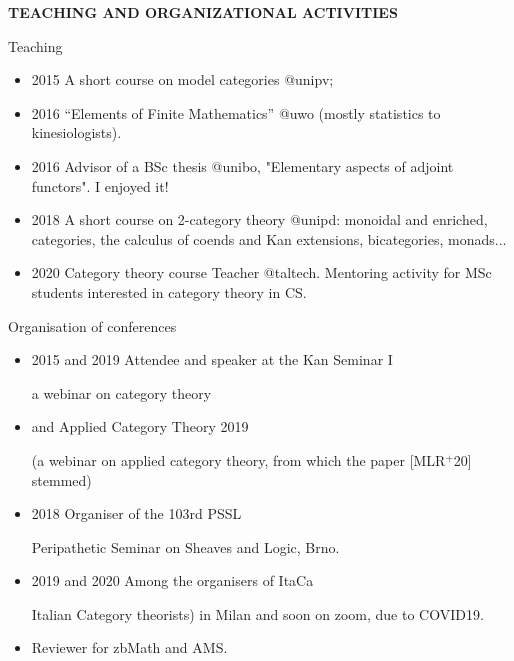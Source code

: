 \documentclass{beamer}
\def\lnk#1{\href{#1}{\faFilePdfO}}
\begin{document}
%
%
%
%
%
\begin{frame}
  \Huge\centering \bfseries TEACHING AND ORGANIZATIONAL ACTIVITIES
\end{frame}
%
\begin{frame}{Teaching}\small
  \begin{itemize}
    \item<+-> 2015 A short course on \alert{model categories} {\color{magenta} @unipv};
    \item<+-> 2016 ``\alert{Elements of Finite Mathematics}'' {\color{magenta} @uwo} (mostly statistics to kinesiologists).
    \item<+-> 2016 \alert{Advisor} of a BSc thesis {\color{magenta} @unibo}, "Elementary aspects of adjoint functors". I enjoyed it!
    \item<+-> 2018 A short course on \alert{2-category theory} {\color{magenta} @unipd}: monoidal and enriched, categories, the calculus of coends and Kan extensions, bicategories, monads...
    \item<+-> 2020 \alert{Category theory} course Teacher {\color{magenta} @taltech}. Mentoring activity for MSc students interested in category theory in CS.
\end{itemize}
\end{frame}
\begin{frame}{Organisation of conferences}\small
  \begin{itemize}
    \item<+-> 2015 and 2019 Attendee and speaker at the \alert{Kan Seminar I} 
    
    {\footnotesize\color{gray!40} a webinar on category theory}
    \item<+-> and \alert{Applied Category Theory} 2019 
    
    {\footnotesize\color{gray!40} (a webinar on applied category theory, from which the paper [\alert{MLR$^{+}$20}\lnk{https://arxiv.org/abs/2001.07488}] stemmed)}
    \item<+-> 2018 \alert{Organiser} of the 103rd \alert{PSSL}
    
    {\footnotesize\color{gray!40} Peripathetic Seminar on Sheaves and Logic, Brno.}
    \item<+-> 2019 and 2020 Among the \alert{organisers} of ItaCa 
    
    {\footnotesize\color{gray!40}  \alert{Ita}lian \alert{Ca}tegory theorists) in Milan and soon on zoom, due to COVID19.}
    \item<+-> Reviewer for zbMath and AMS.
  \end{itemize}
\end{frame}
\end{document}
